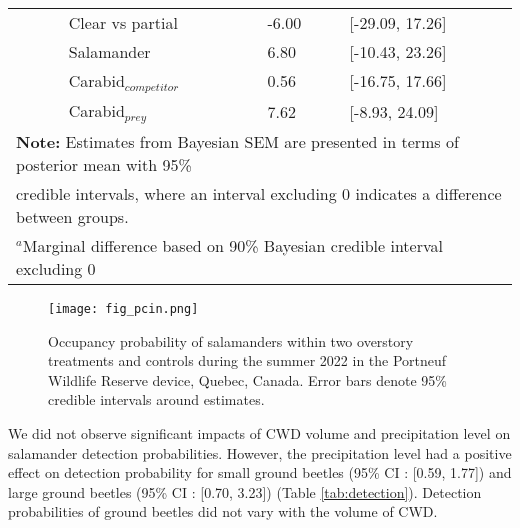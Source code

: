 \begin{table}[ht]
\begin{tabular}{lllll}
                          && Clear vs partial  & -6.00 & [-29.09, 17.26] \\  
                          && Salamander        & \hspace{1mm}6.80 & [-10.43, 23.26] \\ 
                          && Carabid$_{competitor}$      & \hspace{1mm}0.56 & [-16.75, 17.66] \\ 
                          && Carabid$_{prey}$      & \hspace{1mm}7.62 & [-8.93, 24.09] \\ 
      \hline
      \multicolumn{5}{l}{\textbf{Note:} Estimates from Bayesian SEM are presented in terms of posterior mean with 95\%} \\
      \multicolumn{5}{l}{credible intervals, where an interval excluding 0 indicates a difference between groups.} \\
      \multicolumn{5}{l}{$^{a}$Marginal difference based on 90\% Bayesian credible interval excluding 0}
  \end{tabular}
\end{table}


\clearpage

\begin{figure}[ht]
  \centering
  \texttt{[image: fig\_pcin.png]}
  \caption[Occupancy probability of salamanders under overstory treatments]
  {Occupancy probability of salamanders within two overstory treatments and controls during the summer 2022 in the Portneuf Wildlife Reserve device, Quebec, Canada. 
  Error bars denote 95\% credible intervals around estimates.}
  \label{fig:pcin}
\end{figure}

\vspace{10pt}

We did not observe significant impacts of CWD volume and precipitation level on salamander detection probabilities. 
However, the precipitation level had a positive effect on detection probability for small ground beetles (95\% CI : [0.59, 1.77]) and large ground beetles (95\% CI : [0.70, 3.23]) (Table \ref{tab:detection}). 
Detection probabilities of ground beetles did not vary with the volume of CWD.

